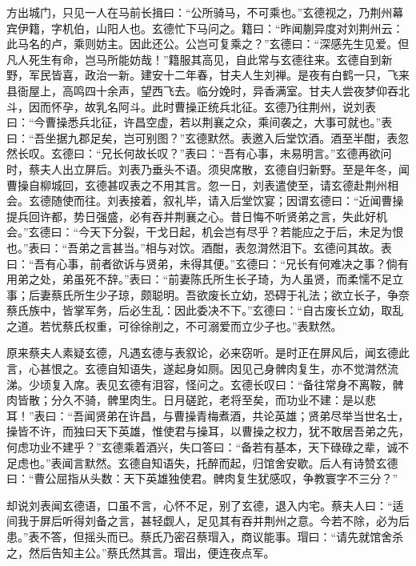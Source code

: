 方出城门，只见一人在马前长揖曰：“公所骑马，不可乘也。”玄德视之，乃荆州幕宾伊籍，字机伯，山阳人也。玄德忙下马问之。籍曰：“昨闻蒯异度对刘荆州云：此马名的卢，乘则妨主。因此还公。公岂可复乘之？”玄德曰：“深感先生见爱。但凡人死生有命，岂马所能妨哉！”籍服其高见，自此常与玄德往来。玄德自到新野，军民皆喜，政治一新。建安十二年春，甘夫人生刘禅。是夜有白鹤一只，飞来县衙屋上，高鸣四十余声，望西飞去。临分娩时，异香满室。甘夫人尝夜梦仰吞北斗，因而怀孕，故乳名阿斗。此时曹操正统兵北征。玄德乃往荆州，说刘表曰：“今曹操悉兵北征，许昌空虚，若以荆襄之众，乘间袭之，大事可就也。”表曰：“吾坐据九郡足矣，岂可别图？”玄德默然。表邀入后堂饮酒。酒至半酣，表忽然长叹。玄德曰：“兄长何故长叹？”表曰：“吾有心事，未易明言。”玄德再欲问时，蔡夫人出立屏后。刘表乃垂头不语。须臾席散，玄德自归新野。至是年冬，闻曹操自柳城回，玄德甚叹表之不用其言。忽一日，刘表遣使至，请玄德赴荆州相会。玄德随使而往。刘表接着，叙礼毕，请入后堂饮宴；因谓玄德曰：“近闻曹操提兵回许都，势日强盛，必有吞并荆襄之心。昔日悔不听贤弟之言，失此好机会。”玄德曰：“今天下分裂，干戈日起，机会岂有尽乎？若能应之于后，未足为恨也。”表曰：“吾弟之言甚当。”相与对饮。酒酣，表忽潸然泪下。玄德问其故。表曰：“吾有心事，前者欲诉与贤弟，未得其便。”玄德曰：“兄长有何难决之事？倘有用弟之处，弟虽死不辞。”表曰：“前妻陈氏所生长子琦，为人虽贤，而柔懦不足立事；后妻蔡氏所生少子琼，颇聪明。吾欲废长立幼，恐碍于礼法；欲立长子，争奈蔡氏族中，皆掌军务，后必生乱：因此委决不下。”玄德曰：“自古废长立幼，取乱之道。若忧蔡氏权重，可徐徐削之，不可溺爱而立少子也。”表默然。

原来蔡夫人素疑玄德，凡遇玄德与表叙论，必来窃听。是时正在屏风后，闻玄德此言，心甚恨之。玄德自知语失，遂起身如厕。因见己身髀肉复生，亦不觉潸然流涕。少顷复入席。表见玄德有泪容，怪问之。玄德长叹曰：“备往常身不离鞍，髀肉皆散；分久不骑，髀里肉生。日月磋跎，老将至矣，而功业不建：是以悲耳！”表曰：“吾闻贤弟在许昌，与曹操青梅煮酒，共论英雄；贤弟尽举当世名士，操皆不许，而独曰天下英雄，惟使君与操耳，以曹操之权力，犹不敢居吾弟之先，何虑功业不建乎？”玄德乘着酒兴，失口答曰：“备若有基本，天下碌碌之辈，诚不足虑也。”表闻言默然。玄德自知语失，托醉而起，归馆舍安歇。后人有诗赞玄德曰：“曹公屈指从头数：天下英雄独使君。髀肉复生犹感叹，争教寰字不三分？”

却说刘表闻玄德语，口虽不言，心怀不足，别了玄德，退入内宅。蔡夫人曰：“适间我于屏后听得刘备之言，甚轻觑人，足见其有吞并荆州之意。今若不除，必为后患。”表不答，但摇头而已。蔡氏乃密召蔡瑁入，商议能事。瑁曰：“请先就馆舍杀之，然后告知主公。”蔡氏然其言。瑁出，便连夜点军。

